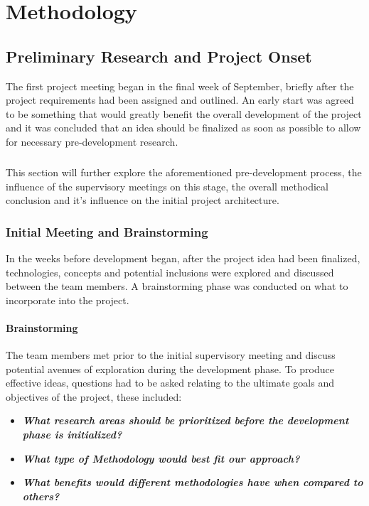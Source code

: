 \chapter{Methodology}

\section{Preliminary Research and Project Onset}
The first project meeting began in the final week of September, briefly after the project requirements had been assigned and outlined. An early start was agreed to be something that would greatly benefit the overall development of the project and it was concluded that an idea should be finalized as soon as possible to allow for necessary pre-development research.

\paragraph{}
This section will further explore the aforementioned pre-development process, the influence of the supervisory meetings on this stage, the overall methodical conclusion and it's influence on the initial project architecture.

\subsection{Initial Meeting and Brainstorming}
In the weeks before development began, after the project idea had been finalized, technologies, concepts and potential inclusions were explored and discussed between the team members. A brainstorming phase was conducted on what to incorporate into the project.

\subsubsection{Brainstorming}
The team members met prior to the initial supervisory meeting and discuss potential avenues of exploration during the development phase. To produce effective ideas, questions had to be asked relating to the ultimate goals and objectives of the project, these included:

\begin{itemize}
    \item\textit{\textbf{What research areas should be prioritized before the development phase is initialized?}}
    \item\textit{\textbf{What type of Methodology would best fit our approach?}}
    \item\textit{\textbf{What benefits would different methodologies have when compared to others?}}
\end{itemize}

